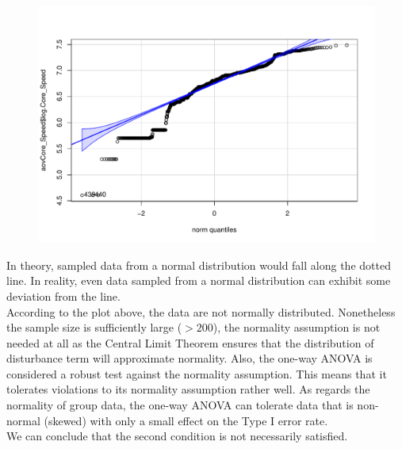 \documentclass[a4paper]{article}
\begin{document}
\begin{figure}[H]
    \centering
    \includegraphics[keepaspectratio, width=1\textwidth, height=1\textheight]{Hypothesis/ANOVA/QQ_Plot.pdf}
\end{figure}
In theory, sampled data from a normal distribution would fall along the dotted line. In reality, even data sampled from a normal distribution can exhibit some deviation from the line.\bigskip \\
According to the plot above, the data are not normally distributed. Nonetheless the sample size is sufficiently large ($>200$), the normality assumption is not needed at all as the Central Limit Theorem ensures that the distribution of disturbance term will approximate normality. Also, the one-way ANOVA is considered a robust test against the normality assumption. This means that it tolerates violations to its normality assumption rather well. As regards the normality of group data, the one-way ANOVA can tolerate data that is non-normal (skewed) with only a small effect on the Type I error rate.\bigskip\\
We can conclude that the second condition is not necessarily satisfied.
\end{document}
